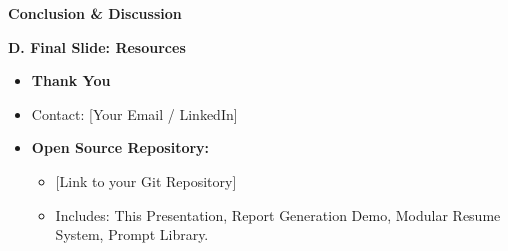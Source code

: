 \documentclass[
  ignorenonframetext,
  aspectratio=169,
]{beamer}
\providecommand{\tightlist}{%
  \setlength{\itemsep}{0pt}\setlength{\parskip}{0pt}}
\begin{document}
\begin{frame}{\textbf{Conclusion \& Discussion}}
\begin{block}{\textbf{D. Final Slide: Resources}}
\label{d.-final-slide-resources}
\begin{itemize}
\tightlist
\item
  \textbf{Thank You}\\
\item
  Contact: {[}Your Email / LinkedIn{]}\\
\item
  \textbf{Open Source Repository:}

  \begin{itemize}
  \tightlist
  \item
    {[}Link to your Git Repository{]}\\
  \item
    Includes: This Presentation, Report Generation Demo, Modular Resume
    System, Prompt Library.
  \end{itemize}
\end{itemize}
\end{block}
\end{frame}
\end{document}
